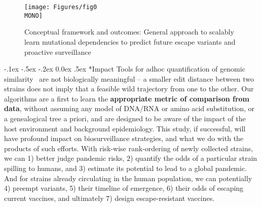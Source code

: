 \documentclass[onecolumn, compsoc,12pt]{IEEEtran}
\makeatletter
\renewcommand\paragraph{\@startsection {section}{1}{\z@}%
                                   {-.1ex \@plus -.5ex \@minus -.2ex}%
                                   {0.0ex \@plus.5ex}%
                                   {\fontsize{11}{10}\selectfont\bfseries\itshape\sffamily\color{black}}}
\renewcommand{\captionN}[1]{\caption{\color{CadetBlue4!80!black} \sffamily \fontsize{9}{10}\selectfont #1  }}
\def\hcov{SARS-CoV-2\xspace}
\def\infl{Influenza A\xspace}
\def\MONO{mono}
\makeatother
\begin{document}
\begin{wrapfigure}[17]{l}{4.7in}
\vspace{-29pt}

  \texttt{[image: Figures/fig0\\MONO]}
  
    \vspace{-18pt}

  \captionN{Conceptual framework and outcomes: General approach to scalably learn mutational  dependencies to predict future escape variants and proactive surveillance }\label{fig1}
  \vspace{5pt}
  
\end{wrapfigure}\paragraph*{Impact}  Tools for adhoc quantification of genomic similarity~\cite{posada1998modeltest,goldberger2005genomic,huelsenbeck1997phylogeny,neher2014predicting,VanderMeer2010,Smith2009} are not biologically meaningful -- a smaller edit distance between two strains  does not imply that a feasible wild trajectory  from one to the other.  Our  algorithms are a first to learn the \textbf{appropriate metric of comparison from data}, without assuming any model of DNA/RNA or amino acid substitution, or a genealogical tree a priori, and are  designed to be aware of the impact of the  host environment and background epidemiology. %
This study, if successful, will have profound impact on  biosurveillance strategies, and what we do with the products of such efforts. With  risk-wise rank-ordering of  newly collected strains, we can  1) better judge pandemic risks, 2) quantify the odds of a particular strain spilling to humans, and 3) estimate its potential to lead to a global pandemic. And for strains already circulating in the human population, we can potentially  4) preempt variants, 5) their timeline of emergence,  6) their odds of escaping current vaccines, and ultimately 7) design escape-resistant vaccines.
\end{document}
